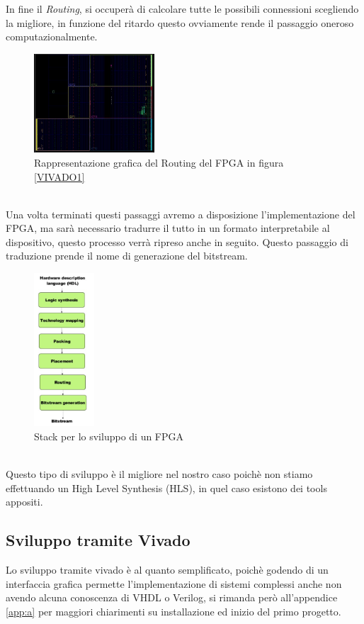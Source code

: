 In fine il \textit{Routing}, si occuperà di calcolare tutte le possibili connessioni scegliendo la migliore, in funzione del ritardo questo ovviamente rende il passaggio oneroso computazionalmente.
\begin{figure}[h]
\centering
\includegraphics[width=0.4\textwidth]{images/Route.jpg}
\caption{Rappresentazione grafica del Routing del FPGA in figura \ref{VIVADO1}}
\end{figure}\\
Una volta terminati questi passaggi avremo a disposizione l'implementazione del FPGA, ma sarà necessario tradurre il tutto in un formato interpretabile al dispositivo, questo processo verrà ripreso anche in seguito. Questo passaggio di traduzione prende il nome di generazione del bitstream.
\begin{figure}[h]
\centering
\includegraphics[width=0.2\textwidth]{images/Stack.jpg}
\caption{Stack per lo sviluppo di un FPGA}
\end{figure}\\
Questo tipo di sviluppo è il migliore nel nostro caso poichè non stiamo effettuando un High Level Synthesis (HLS), in quel caso esistono dei tools appositi.
\subsection{Sviluppo tramite Vivado}
Lo sviluppo tramite vivado è al quanto semplificato, poichè godendo di un interfaccia grafica permette l'implementazione di sistemi complessi anche non avendo alcuna conoscenza di VHDL o Verilog, si rimanda però all'appendice \ref{app:a} per maggiori chiarimenti su installazione ed inizio del primo progetto.
